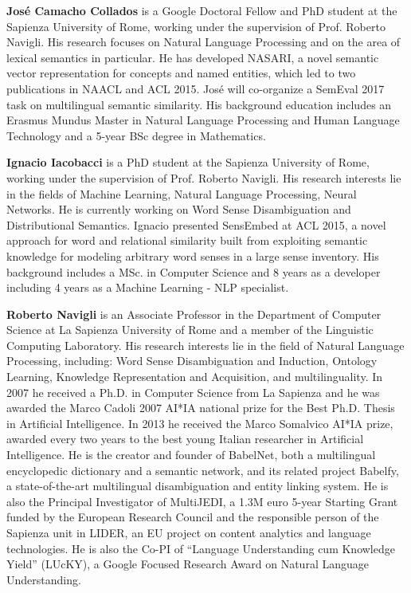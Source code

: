 \begin{bio}
{\bfseries Jos\'{e} Camacho Collados} is a Google Doctoral Fellow and PhD student at the Sapienza University of Rome, working under the supervision of Prof. Roberto Navigli. His research focuses on Natural Language Processing and on the area of lexical semantics in particular. He has developed NASARI, a novel semantic vector representation for concepts and named entities, which led to two publications in NAACL and ACL 2015. Jos\'{e} will co-organize a SemEval 2017 task on multilingual semantic similarity. His background education includes an Erasmus Mundus Master in Natural Language Processing and Human Language Technology and a 5-year BSc degree in Mathematics.

{\bfseries Ignacio Iacobacci} is a PhD student at the Sapienza University of Rome, working under the supervision of Prof. Roberto Navigli. His research interests lie in the fields of Machine Learning, Natural Language Processing, Neural Networks. He is currently working on Word Sense Disambiguation and Distributional Semantics. Ignacio presented SensEmbed at ACL 2015, a novel approach for word and relational similarity built from exploiting semantic knowledge for modeling arbitrary word senses in a large sense inventory. His background includes a MSc. in Computer Science and 8 years as a developer including 4 years as a Machine Learning - NLP specialist.

{\bfseries Roberto Navigli} is an Associate Professor in the Department of Computer Science at La Sapienza University of Rome and a member of the Linguistic Computing Laboratory. His research interests lie in the field of Natural Language Processing, including: Word Sense Disambiguation and Induction, Ontology Learning, Knowledge Representation and Acquisition, and multilinguality. In 2007 he received a Ph.D. in Computer Science from La Sapienza and he was awarded the Marco Cadoli 2007 AI*IA national prize for the Best Ph.D. Thesis in Artificial Intelligence. In 2013 he received the Marco Somalvico AI*IA prize, awarded every two years to the best young Italian researcher in Artificial Intelligence. He is the creator and founder of BabelNet, both a multilingual encyclopedic dictionary and a semantic network, and its related project Babelfy, a state-of-the-art multilingual disambiguation and entity linking system. He is also the Principal Investigator of MultiJEDI, a 1.3M euro 5-year Starting Grant funded by the European Research Council and the responsible person of the Sapienza unit in LIDER, an EU project on content analytics and language technologies. He is also the Co-PI of ``Language Understanding cum Knowledge Yield'' (LUcKY), a Google Focused Research Award on Natural Language Understanding.


\end{bio}
